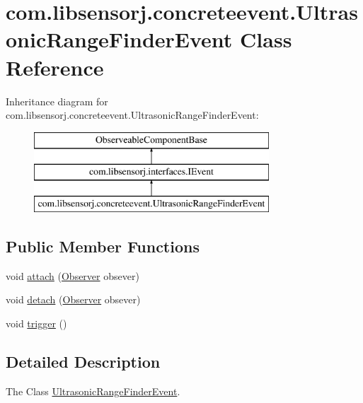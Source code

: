 \hypertarget{classcom_1_1libsensorj_1_1concreteevent_1_1UltrasonicRangeFinderEvent}{}\section{com.\+libsensorj.\+concreteevent.\+Ultrasonic\+Range\+Finder\+Event Class Reference}
\label{classcom_1_1libsensorj_1_1concreteevent_1_1UltrasonicRangeFinderEvent}
Inheritance diagram for com.\+libsensorj.\+concreteevent.\+Ultrasonic\+Range\+Finder\+Event\+:\begin{figure}[H]
\begin{center}
\leavevmode
\includegraphics[height=3.000000cm]{classcom_1_1libsensorj_1_1concreteevent_1_1UltrasonicRangeFinderEvent}
\end{center}
\end{figure}
\subsection*{Public Member Functions}
\begin{DoxyCompactItemize}
\item 
void \hyperlink{classcom_1_1libsensorj_1_1concreteevent_1_1UltrasonicRangeFinderEvent_a0b32d3efeb55247269b4f43e4e34fe8e}{attach} (\hyperlink{classcom_1_1libsensorj_1_1model_1_1Observer}{Observer} obsever)
\item 
void \hyperlink{classcom_1_1libsensorj_1_1concreteevent_1_1UltrasonicRangeFinderEvent_ab0647f65e87ff07f61b3e4fe7e1daa19}{detach} (\hyperlink{classcom_1_1libsensorj_1_1model_1_1Observer}{Observer} obsever)
\item 
void \hyperlink{classcom_1_1libsensorj_1_1concreteevent_1_1UltrasonicRangeFinderEvent_a4d1ba316d1d324c4fb6e321e4c7a7b6e}{trigger} ()
\end{DoxyCompactItemize}


\subsection{Detailed Description}
The Class \hyperlink{classcom_1_1libsensorj_1_1concreteevent_1_1UltrasonicRangeFinderEvent}{Ultrasonic\+Range\+Finder\+Event}. 

